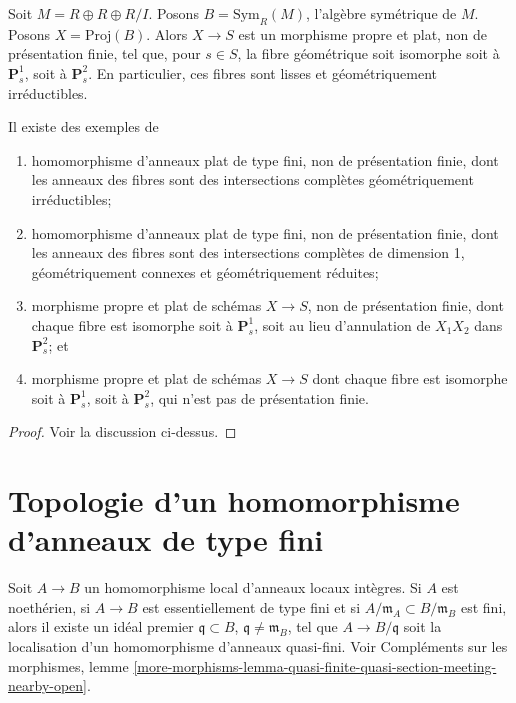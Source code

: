 \medskip\noindent
Soit $M = R \oplus R \oplus R/I$. Posons $B = \text{Sym}_R(M)$, l'algèbre
symétrique de $M$. Posons $X = \text{Proj}(B)$.
Alors $X \to S$ est un morphisme propre et plat, non de présentation finie,
tel que, pour $s \in S$, la fibre géométrique soit isomorphe soit à
$\mathbf{P}^1_s$, soit à $\mathbf{P}^2_s$. En particulier, ces fibres sont
lisses et géométriquement irréductibles.

\begin{lemma}
\label{lemma-finite-type-flat-not-finitely-presented}
Il existe des exemples de
\begin{enumerate}
\item homomorphisme d'anneaux plat de type fini, non de présentation finie,
dont les anneaux des fibres sont des intersections complètes géométriquement irréductibles;
\item homomorphisme d'anneaux plat de type fini, non de présentation finie,
dont les anneaux des fibres sont des intersections complètes de dimension 1,
géométriquement connexes et géométriquement réduites;
\item morphisme propre et plat de schémas $X \to S$, non de présentation finie,
dont chaque fibre est isomorphe soit à $\mathbf{P}^1_s$, soit au lieu d'annulation de
$X_1X_2$ dans $\mathbf{P}^2_s$; et
\item morphisme propre et plat de schémas $X \to S$ dont chaque
fibre est isomorphe soit à $\mathbf{P}^1_s$, soit à $\mathbf{P}^2_s$,
qui n'est pas de présentation finie.
\end{enumerate}
\end{lemma}

\begin{proof}
Voir la discussion ci-dessus.
\end{proof}



\section{Topologie d'un homomorphisme d'anneaux de type fini}
\label{section-topology-finite-type}

\noindent
Soit $A \to B$ un homomorphisme local d'anneaux locaux intègres.
Si $A$ est noethérien, si $A \to B$ est essentiellement de type fini
et si $A/\mathfrak m_A \subset B/\mathfrak m_B$ est fini, alors il
existe un idéal premier $\mathfrak q \subset B$, $\mathfrak q \not = \mathfrak m_B$,
tel que $A \to B/\mathfrak q$ soit la localisation d'un homomorphisme d'anneaux
quasi-fini. Voir
Compléments sur les morphismes, lemme
\ref{more-morphisms-lemma-quasi-finite-quasi-section-meeting-nearby-open}.

